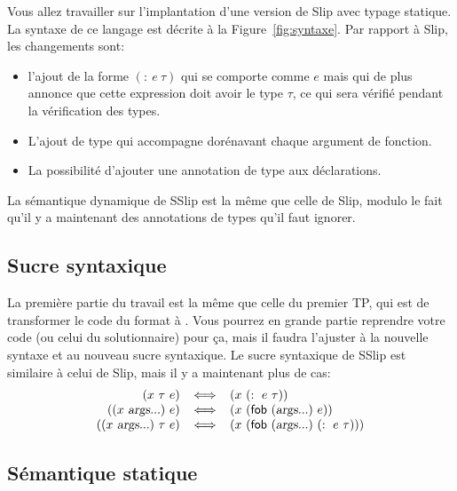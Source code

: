 \documentclass{article}
\begin{document}
\noindent
Vous allez travailler sur l'implantation d'une version de Slip avec typage
statique.  La syntaxe de ce langage est décrite à la
Figure~\ref{fig:syntaxe}.  Par rapport à Slip, les changements sont:
\begin{itemize}
\item l'ajout de la forme $(:~e~\tau)$ qui se comporte comme $e$ mais qui de
  plus annonce que cette expression doit avoir le type $\tau$, ce qui sera
  vérifié pendant la vérification des types.
\item L'ajout de type qui accompagne dorénavant chaque argument de fonction.
\item La possibilité d'ajouter une annotation de type aux déclarations.
\end{itemize}
La sémantique dynamique de SSlip est la même que celle de Slip, modulo le
fait qu'il y a maintenant des annotations de types qu'il faut ignorer.

\subsection{Sucre syntaxique}

\noindent
La première partie du travail est la même que celle du premier TP, qui est
de transformer le code du format  à .  Vous pourrez en
grande partie reprendre votre code (ou celui du solutionnaire) pour ça, mais
il faudra l'ajuster à la nouvelle syntaxe et au nouveau sucre syntaxique.
Le sucre syntaxique de SSlip est similaire à celui de Slip, mais il
y a maintenant plus de cas:
\begin{displaymath}
  \begin{array}{r@{\;\;\;\;\Longleftrightarrow\;\;\;\;}l}
    (x~\tau~e) & (x~(:~e~\tau)) \\
    ((x~\textsl{args...})~e) &
        (x~(\kw{fob}~(\textsl{args...})~e)) \\
    ((x~\textsl{args...})~\tau~e) &
        (x~(\kw{fob}~(\textsl{args...})~(:~e~\tau)))
  \end{array}
\end{displaymath}

\subsection{Sémantique statique}

\newcommand \CheckKind [1] {\vdash #1}
\newcommand \CheckType [2][\Gamma] {#1 \vdash #2 ~:~}
\newcommand \InferType [2][\Gamma] {#1 \vdash #2 ~:~}
\newcommand \BothType [2][\Gamma] {#1 \vdash #2 ~:~}
\newcommand \Axiom [2] { \mbox{}\hspace{10pt}\nolinebreak\ensuremath{\displaystyle
    \frac{#1}{#2}}\nolinebreak\hspace{10pt}\mbox{} \medskip}
\newcommand \HA {\hspace{17pt}}
\renewcommand \: {\!:\!}
\end{document}
